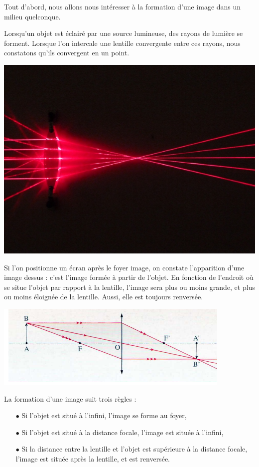 \documentclass[a4paper, 12pt, onecolumn, openany]{report}
\begin{document}
	Tout d’abord, nous allons nous intéresser à la formation d’une image dans un milieu quelconque.
	
	Lorsqu’un objet est éclairé par une source lumineuse, des rayons de lumière se forment. Lorsque l’on intercale une lentille convergente entre ces rayons, nous constatons qu’ils convergent en un point.
	
	\includegraphics[scale=0.4]{lentille_convergente.jpg}
		
	Si l’on positionne un écran après le foyer image, on constate l’apparition d’une image dessus : c’est l’image formée à partir de l’objet. En fonction de l’endroit où se situe l’objet par rapport à la lentille, l’image sera plus ou moins grande, et plus ou moins éloignée de la lentille. Aussi, elle est toujours renversée. 
	
	\includegraphics[scale=1]{formation_image.png}
		
		La formation d’une image suit trois règles :
		\begin{itemize}
		\item[$\bullet$] Si l’objet est situé à l’infini, l’image se forme au foyer,
		\item[$\bullet$] Si l’objet est situé à la distance focale, l’image est située à l’infini,
		\item[$\bullet$] Si la distance entre la lentille et l’objet est supérieure à la distance focale, l’image est située après la lentille, et est renversée.
		\end{itemize}
		
\end{document}
